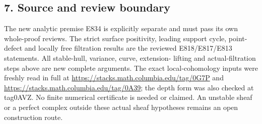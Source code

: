 \subsection{7. Source and review
boundary}\label{SF-E835:source-and-review-boundary}

The new analytic premise E834 is explicitly separate and must pass its
own whole-proof reviews. The strict surface positivity, leading support
cycle, point-defect and locally free filtration results are the reviewed
E818/E817/E813 statements. All stable-hull, variance, curve, extension-
lifting and actual-filtration steps above are new complete arguments.
The exact local-cohomology inputs were freshly read in full at
\url{https://stacks.math.columbia.edu/tag/0G7P} and
\url{https://stacks.math.columbia.edu/tag/0A39}; the depth form was also
checked at tag0AVZ. No finite numerical certificate is needed or
claimed. An unstable sheaf or a perfect complex outside these actual
sheaf hypotheses remains an open construction route.
